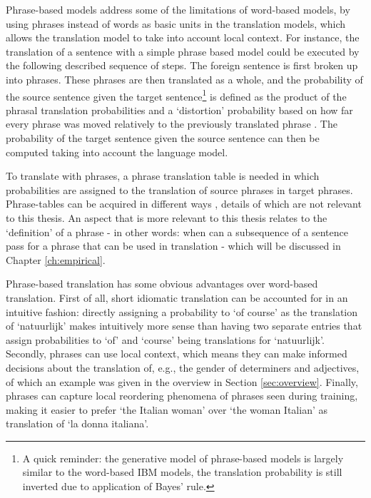 Phrase-based models address some of the limitations of word-based models, by using phrases instead of words as basic units in the translation models, which allows the translation model to take into account local context. For instance, the translation of a sentence with a simple phrase based model could be executed by the following described sequence of steps. The foreign sentence is first broken up into phrases. These phrases are then translated as a whole, and the probability of the source sentence given the target sentence\footnote{A quick reminder: the generative model of phrase-based models is largely similar to the word-based IBM models, the translation probability is still inverted due to application of Bayes' rule.} is defined as the product of the phrasal translation probabilities and a `distortion' probability based on how far every phrase was moved relatively to the previously translated phrase \citep{koehn2003statistical}. The probability of the target sentence given the source sentence can then be computed taking into account the language model.

To translate with phrases, a phrase translation table is needed in which probabilities are assigned to the translation of source phrases in target phrases. Phrase-tables can be acquired in different ways \citep{marcu2002phrase,och1999improved,koehn2003statistical,mylonakis_simaan_emnlp_2008}, details of which are not relevant to this thesis. An aspect that is more relevant to this thesis relates to the `definition' of a phrase -  in other words: when can a subsequence of a sentence pass for a phrase that can be used in translation - which will be discussed in Chapter \ref{ch:empirical}.

Phrase-based translation has some obvious advantages over word-based translation. First of all, short idiomatic translation can be accounted for in an intuitive fashion: directly assigning a probability to `of course' as the translation of `natuurlijk' makes intuitively more sense than having two separate entries that assign probabilities to `of' and `course' being translations for `natuurlijk'. Secondly, phrases can use local context, which means they can make informed decisions about the translation of, e.g., the gender of determiners and adjectives, of which an example was given in the overview in Section \ref{sec:overview}. Finally, phrases can capture local reordering phenomena of phrases seen during training, making it easier to prefer `the Italian woman' over `the woman Italian' as translation of `la donna italiana'.

